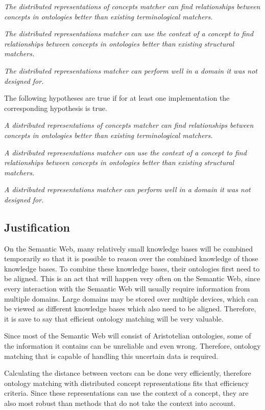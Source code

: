 \documentclass{article}
\begin{document}
 \textit{The distributed representations of concepts matcher can find relationships between concepts in ontologies better than existing terminological matchers.}
 
 \textit{The distributed representations matcher can use the context of a concept to find relationships between concepts in ontologies better than existing structural matchers.}
 
 \textit{The distributed representations matcher can perform well in a domain it was not designed for.}
 
 The following hypotheses are true if for at least one implementation the corresponding hypothesis is true.
 
 \textit{A distributed representations of concepts matcher can find relationships between concepts in ontologies better than existing terminological matchers.}
 
 \textit{A distributed representations matcher can use the context of a concept to find relationships between concepts in ontologies better than existing structural matchers.}
 
 \textit{A distributed representations matcher can perform well in a domain it was not designed for.}
 
 \subsection{Justification}
 On the Semantic Web, many relatively small knowledge bases will be combined temporarily so that it is possible to reason over the combined knowledge of those knowledge bases. To combine these knowledge bases, their ontologies first need to be aligned. This is an act that will happen very often on the Semantic Web, since every interaction with the Semantic Web will usually require information from multiple domains. Large domains may be stored over multiple devices, which can be viewed as different knowledge bases which also need to be aligned. Therefore, it is save to say that efficient ontology matching will be very valuable.
 
 Since most of the Semantic Web will consist of Aristotelian ontologies, some of the information it contains can be unreliable and even wrong. Therefore, ontology matching that is capable of handling this uncertain data is required.
 
 Calculating the distance between vectors can be done very efficiently, therefore ontology matching with distributed concept representations fits that efficiency criteria. Since these representations can use the context of a concept, they are also most robust than methods that do not take the context into account.
 
\end{document}
